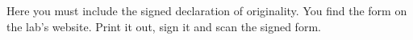 \documentclass[11pt,a4paper,twoside]{report}
\begin{document}
\cleardoublepage

\fancyhead[LO]{\scshape\bibname}
\fancyhead[RO]{}
\fancyhead[LE]{}
\fancyhead[RE]{\scshape\bibname}



\cleardoublepage

\fancyhead[LO]{\scshape \listfigurename}
\fancyhead[RO]{}
\fancyhead[LE]{}
\fancyhead[RE]{\scshape \listfigurename}
\listoffigures

\cleardoublepage

\fancyhead[LO]{\scshape \listtablename}
\fancyhead[RO]{}
\fancyhead[LE]{}
\fancyhead[RE]{\scshape \listtablename}
\listoftables

\cleardoublepage
\fancyhead[LO]{}
\fancyhead[RO]{}
\fancyhead[LE]{}
\fancyhead[RE]{}


%

Here you must include the signed declaration of originality. You find
the form on the lab's website. Print it out, sign it and scan the
signed form.
\end{document}
